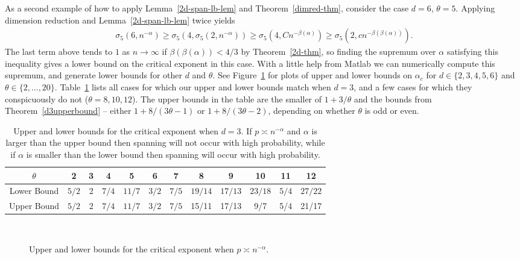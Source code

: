 \documentclass{amsart}
\newcommand{\threshold}{\theta}
\numberwithin{equation}{section}
\theoremstyle{definition}
\theoremstyle{remark}
\begin{document}
As a second example of how to apply Lemma~\ref{2d-span-lb-lem} and Theorem~\ref{dimred-thm}, consider the case $d=6$, $\threshold=5$.  Applying dimension reduction and Lemma~\ref{2d-span-lb-lem} twice yields
\begin{align*}
\sigma_5 ( 6,n^{-\alpha}) \geq \sigma_5(4,\sigma_5(2,n^{-\alpha})) \geq \sigma_5(4,Cn^{-\beta(\alpha)}) \geq \sigma_5(2,c n^{-\beta(\beta(\alpha))}).
\end{align*}
The last term above tends to $1$ as $n\to \infty$ if $\beta(\beta(\alpha)) < 4/3$ by Theorem~\ref{2d-thm}, so finding the supremum over $\alpha$ satisfying this inequality gives a lower bound on the critical exponent in this case.  With a little help from Matlab we can numerically compute this supremum, and generate lower bounds for other $d$ and $\threshold$.  See Figure~\ref{alpha-bounds} for plots of upper and lower bounds on $\alpha_c$ for $d \in \{2,3,4,5,6\}$ and $\theta \in \{2, \ldots, 20\}$.  Table~\ref{exact-exponents} lists all cases for which our upper and lower bounds match when $d=3$, and a few cases for which they conspicuously do not ($\threshold = 8,10,12$).  The upper bounds in the table are the smaller of $1+3/\threshold$ and the bounds from Theorem~\ref{d3upperbound} -- either $1+8/(3\threshold-1)$ or $1+8/(3\threshold-2)$, depending on whether $\threshold$ is odd or even.
\begin{table}
\begin{center}
\begin{tabular}{|c||c|c|c|c|c|c|c|c|c|c|c|}\hline
$\threshold$ & 2 & 3 & 4 &5 & 6& 7& 8& 9& 10& 11&12 \\ \hline\hline
Lower Bound & $5/2$ & 2 & $7/4$ & $11/7$& $3/2$ & $7/5$ & $19/14$ & $17/13$ & $23/18$ &$5/4$ & $27/22$ \\ \hline
Upper Bound & $5/2$ & 2 & $7/4$ & $11/7$& $3/2$ & $7/5$ &15/11 & 17/13& 9/7 & 5/4 & 21/17\\ \hline
\end{tabular}
\end{center}
\caption{Upper and lower bounds for the critical exponent when $d=3$.  If $p\asymp n^{-\alpha}$ and $\alpha$ is larger than the upper bound then spanning will not occur with high probability, while if $\alpha$ is smaller than the lower bound then spanning will occur with high probability.}
\label{exact-exponents}
\end{table}

\begin{figure}[htd]
	\centering
	\hspace{.1in}
	\\
	\hspace{.1in}
	\caption{Upper and lower bounds for the critical exponent when $p \asymp n^{-\alpha}$.}
	\label{alpha-bounds}
\end{figure}
\end{document}
